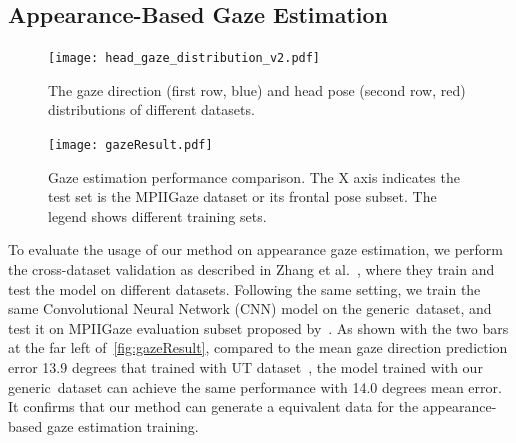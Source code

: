 
\subsection{Appearance-Based Gaze Estimation}




\begin{figure}
    \centering
    \texttt{[image: head\_gaze\_distribution\_v2.pdf]}
    \caption{The gaze direction (first row, blue) and head pose (second row, red) distributions of different datasets.}
    \label{fig:head_gaze_distribution}
\end{figure}

\begin{figure}
    \centering
    \texttt{[image: gazeResult.pdf]}
    \caption{Gaze estimation performance comparison. The X axis indicates the test set is the MPIIGaze dataset or its frontal pose subset. The legend shows different training sets.}
    \label{fig:gazeResult}
\end{figure}

To evaluate the usage of our method on appearance gaze estimation, we perform the cross-dataset validation as described in Zhang et al.~\cite{zhang15_cvpr}, where they train and test the model on different datasets. Following the same setting, we train the same Convolutional Neural Network (CNN) model on the generic~\dataset dataset, and test it on MPIIGaze evaluation subset proposed by~\cite{zhang15_cvpr}. As shown with the two bars at the far left of~\autoref{fig:gazeResult}, compared to the mean gaze direction prediction error 13.9 degrees that trained with UT dataset~\cite{sugano2014learning}, the model trained with our generic~\dataset dataset can achieve the same performance with 14.0 degrees mean error. It confirms that our method can generate a equivalent data for the appearance-based gaze estimation training.

